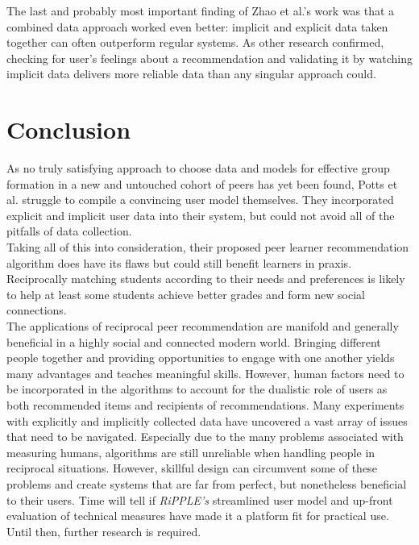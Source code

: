 \documentclass[conference]{IEEEtran}
\begin{document}
The last and probably most important finding of Zhao et al.'s work was that a combined data approach worked even better: implicit and explicit data taken together can often outperform regular systems. As other research confirmed, checking for user's feelings about a recommendation and validating it by watching implicit data delivers more reliable data than any singular approach could. \cite{zhao2018explicit, 8328917,7994718}\\

\section{Conclusion}
As no truly satisfying approach to choose data and models for effective group formation in a new and untouched cohort of peers has yet been found, Potts et al. struggle to compile a convincing user model themselves. They incorporated explicit and implicit user data into their system, but could not avoid all of the pitfalls of data collection.\\ 
Taking all of this into consideration, their proposed peer learner recommendation algorithm does have its flaws but could still benefit learners in praxis. Reciprocally matching students according to their needs and preferences is likely to help at least some students achieve better grades and form new social connections.\\
The applications of reciprocal peer recommendation are manifold and generally beneficial in a highly social and connected modern world. Bringing different people together and providing opportunities to engage with one another yields many advantages and teaches meaningful skills. However, human factors need to be incorporated in the algorithms to account for the dualistic role of users as both recommended items and recipients of recommendations. Many experiments with explicitly and implicitly collected data have uncovered a vast array of issues that need to be navigated. Especially due to the many problems associated with measuring humans, algorithms are still unreliable when handling people in reciprocal situations. However, skillful design can circumvent some of these problems and create systems that are far from perfect, but nonetheless beneficial to their users. Time will tell if \textit{RiPPLE's} streamlined user model and up-front evaluation of technical measures have made it a platform fit for practical use. Until then, further research is required.\\
\end{document}

